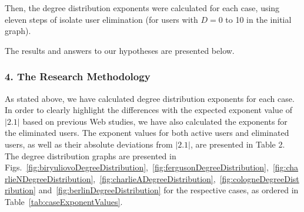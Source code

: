 Then, the degree distribution exponents were calculated for each case, using eleven steps of isolate user elimination (for users with \(D = 0\) to 10 in the initial graph).

The results and answers to our hypotheses are presented below.

\subsubsection{4. The Research Methodology}

As stated above, we have calculated degree distribution exponents for each case. In order to clearly highlight the differences with the expected exponent value of \(\lvert2.1\rvert\) based on previous Web studies, we have also calculated the exponents for the eliminated users. The exponent values for both active users and eliminated users, as well as their absolute deviations from \(\lvert2.1\rvert\), are presented in Table 2. The degree distribution graphs are presented in Figs.~\cref{fig:biryuliovoDegreeDistribution},~\cref{fig:fergusonDegreeDistribution},~\cref{fig:charlieNDegreeDistribution},~\cref{fig:charlieADegreeDistribution},~\cref{fig:cologneDegreeDistribution} and~\cref{fig:berlinDegreeDistribution} for the respective cases, as ordered in Table~\cref{tab:caseExponentValues}.

